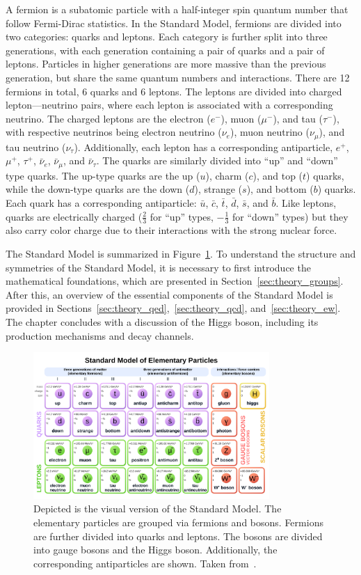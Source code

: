 A fermion is a subatomic particle with a half-integer spin quantum number that follow Fermi-Dirac statistics. In the Standard Model, fermions are divided into two categories: quarks and leptons. Each category is further split into three generations, with each generation containing a pair of quarks and a pair of leptons. Particles in higher generations are more massive than the previous generation, but share the same quantum numbers and interactions. There are 12 fermions in total, 6 quarks and 6 leptons. The leptons are divided into charged lepton---neutrino pairs, where each lepton is associated with a corresponding neutrino. The charged leptons are the electron ($e^{-}$), muon ($\mu^{-}$), and tau ($\tau^{-}$), with respective neutrinos being electron neutrino ($\nu_{e}$), muon neutrino ($\nu_{\mu}$), and tau neutrino ($\nu_{\tau}$). Additionally, each lepton has a corresponding antiparticle, $e^{+}$, $\mu^{+}$, $\tau^{+}$, $\bar{\nu}_{e}$, $\bar{\nu}_{\mu}$, and $\bar{\nu}_{\tau}$. 
The quarks are similarly divided into ``up'' and ``down'' type quarks. The up-type quarks are the up ($u$), charm ($c$), and top ($t$) quarks, while the down-type quarks are the down ($d$), strange ($s$), and bottom ($b$) quarks. Each quark has a corresponding antiparticle: $\bar{u}$, $\bar{c}$, $\bar{t}$, $\bar{d}$, $\bar{s}$, and $\bar{b}$. Like leptons, quarks are electrically charged ($\frac{2}{3}$ for ``up'' types, $-\frac{1}{3}$ for ``down'' types) but they also carry color charge due to their interactions with the strong nuclear force.

The Standard Model is summarized in Figure~\ref{fig:standard_model}. To understand the structure and symmetries of the Standard Model, it is necessary to first introduce the mathematical foundations, which are presented in Section~\ref{sec:theory_groups}. After this, an overview of the essential components of the Standard Model is provided in Sections~\ref{sec:theory_qed},~\ref{sec:theory_qcd}, and~\ref{sec:theory_ew}. The chapter concludes with a discussion of the Higgs boson, including its production mechanisms and decay channels.

\begin{figure}[htp]
    \centering
    \includegraphics[width=0.8\textwidth]{figures/theory/theory_standard_model.png}
    \caption{Depicted is the visual version of the Standard Model. The elementary particles are grouped via fermions and bosons. Fermions are further divided into quarks and leptons. The bosons are divided into gauge bosons and the Higgs boson. Additionally, the corresponding antiparticles are shown. Taken from~\cite{theory_sm_figure}.}\label{fig:standard_model}
\end{figure}